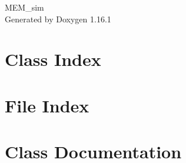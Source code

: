 \documentclass[twoside]{book}
\newcommand{\+}{\discretionary{\mbox{\scriptsize$\hookleftarrow$}}{}{}}
\newcommand{\clearemptydoublepage}{%
    \newpage{\pagestyle{empty}\cleardoublepage}%
  }
\begin{document}
  \raggedbottom
    \hypersetup{pageanchor=false,
                bookmarksnumbered=true,
                pdfencoding=unicode
               }
  \begin{titlepage}
  \vspace*{7cm}
  \begin{center}%
  {\Large MEM\+\_\+sim}\\
  \vspace*{1cm}
  {\large Generated by Doxygen 1.16.1}\\
  \end{center}
  \end{titlepage}
  \clearemptydoublepage
  \tableofcontents
  \clearemptydoublepage
  \hypersetup{pageanchor=true}

\chapter{Class Index}

\chapter{File Index}

\chapter{Class Documentation}











\end{document}
